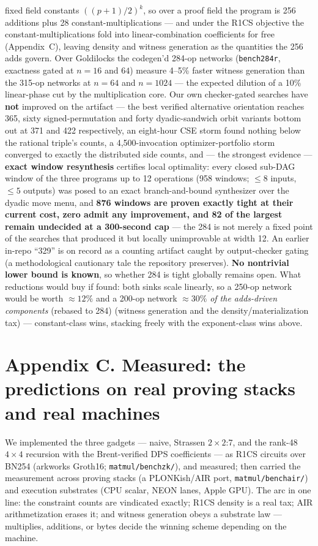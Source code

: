 \documentclass[10pt]{article}
\begin{document}
fixed field constants $((p{+}1)/2)^k$, so over a proof field the
program is 256 additions plus 28 constant-multiplications --- and
under the R1CS objective the constant-multiplications fold into
linear-combination coefficients for free (Appendix~C), leaving
density and witness generation as the quantities the 256 adds
govern. Over Goldilocks the codegen'd 284-op networks
(\texttt{bench284r}, exactness gated at $n = 16$ and $64$)
measure 4--5\% faster witness generation than the 315-op networks
at $n = 64$ and $n = 1024$ --- the expected dilution of a 10\%
linear-phase cut by the multiplication core. Our own
checker-gated searches have \textbf{not} improved on the artifact
--- the best verified alternative orientation reaches 365, sixty
signed-permutation and forty dyadic-sandwich orbit variants
bottom out at 371 and 422 respectively, an eight-hour CSE storm
found nothing below the rational triple's counts, a
4{,}500-invocation optimizer-portfolio storm converged to exactly
the distributed side counts, and --- the strongest evidence ---
\textbf{exact window resynthesis} certifies local optimality:
every closed sub-DAG window of the three programs up to 12
operations (958 windows; $\le 8$ inputs, $\le 5$ outputs) was
posed to an exact branch-and-bound synthesizer over the dyadic
move menu, and \textbf{876 windows are proven exactly tight at
their current cost, zero admit any improvement, and 82 of the
largest remain undecided at a 300-second cap} --- the 284 is not
merely a fixed point of the searches that produced it but locally
unimprovable at width 12. An earlier in-repo ``329'' is on record
as a counting artifact caught by output-checker gating (a
methodological cautionary tale the repository preserves).
\textbf{No nontrivial lower bound is known}, so whether 284 is
tight globally remains open. What reductions would buy if found: both sinks scale
linearly, so a 250-op network would be worth ${\approx}12\%$ and
a 200-op network ${\approx}30\%$ \emph{of the adds-driven
components} (rebased to 284) (witness generation and the density/materialization
tax) --- constant-class wins, stacking freely with the
exponent-class wins above.

\section*{Appendix C. Measured: the predictions on real proving
stacks and real machines}

We implemented the three gadgets --- naive, Strassen $2{\times}2$:7,
and the rank-48 $4{\times}4$ recursion with the Brent-verified DPS
coefficients --- as R1CS circuits over BN254 (arkworks Groth16;
\texttt{matmul/benchzk/}), and measured; then carried the
measurement across proving stacks (a PLONKish/AIR port,
\texttt{matmul/benchair/}) and execution substrates (CPU scalar,
NEON lanes, Apple GPU). The arc in one line: the constraint counts
are vindicated exactly; R1CS density is a real tax; AIR
arithmetization erases it; and witness generation obeys a substrate
law --- multiplies, additions, or bytes decide the winning scheme
depending on the machine.
\end{document}

